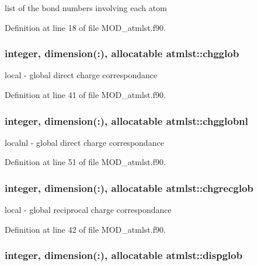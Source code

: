 list of the bond numbers involving each atom 



Definition at line 18 of file M\-O\-D\-\_\-atmlst.\-f90.

\hypertarget{classatmlst_aeed78d19132d1dee9d0d1f85bf32d6ce}{
\subsubsection[{chgglob}]{\setlength{\rightskip}{0pt plus 5cm}integer, dimension(\-:), allocatable atmlst\-::chgglob}}\label{classatmlst_aeed78d19132d1dee9d0d1f85bf32d6ce}


local -\/ global direct charge correspondance 



Definition at line 41 of file M\-O\-D\-\_\-atmlst.\-f90.

\hypertarget{classatmlst_a82002ff33f394239f8587334aa1533b3}{
\subsubsection[{chgglobnl}]{\setlength{\rightskip}{0pt plus 5cm}integer, dimension(\-:), allocatable atmlst\-::chgglobnl}}\label{classatmlst_a82002ff33f394239f8587334aa1533b3}


localnl -\/ global direct charge correspondance 



Definition at line 51 of file M\-O\-D\-\_\-atmlst.\-f90.

\hypertarget{classatmlst_aa383c916e50489948eb0f39c2156b4ed}{
\subsubsection[{chgrecglob}]{\setlength{\rightskip}{0pt plus 5cm}integer, dimension(\-:), allocatable atmlst\-::chgrecglob}}\label{classatmlst_aa383c916e50489948eb0f39c2156b4ed}


local -\/ global reciprocal charge correspondance 



Definition at line 42 of file M\-O\-D\-\_\-atmlst.\-f90.

\hypertarget{classatmlst_a342dc8a9cffba913ea2e51e8669730e7}{
\subsubsection[{dispglob}]{\setlength{\rightskip}{0pt plus 5cm}integer, dimension(\-:), allocatable atmlst\-::dispglob}}\label{classatmlst_a342dc8a9cffba913ea2e51e8669730e7}


